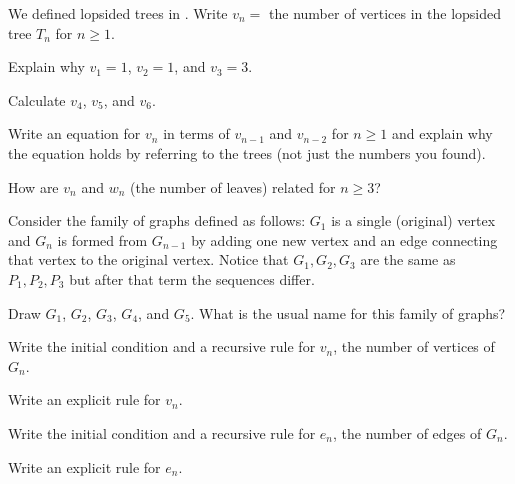 \begin{exer}[\exerP] %
\label{exer_lopsided_trees_vertices}
    We defined lopsided trees in . Write $v_n=$ the number of vertices in the lopsided tree $T_n$ for $n \ge 1$. 
        \begin{exerpart}
            \item  Explain why $v_1=1$, $v_2=1$, and $v_3=3$. 
            \item Calculate $v_4$, $v_5$, and $v_6$.
            \item \label{part_rec_trees_vertices} Write an equation for $v_n$ in terms of $v_{n-1}$ and $v_{n-2}$ for $n \ge 1$ and explain why the equation holds by referring to the trees (not just the numbers you found). 
            \item \label{part_rec_trees_vertices_function_of_leaves} How are $v_n$ and $w_n$ (the number of leaves) related for $n \ge 3$? 
        \end{exerpart}
\end{exer}

\begin{exer}[\exerU] %
\label{exer_rec_def_star_graphs}
    Consider the family of graphs defined as follows: $G_1$ is a single (original) vertex and $G_n$ is formed from $G_{n-1}$ by adding one new vertex and an edge connecting that vertex to the original vertex. Notice that $G_1, G_2, G_3$ are the same as $P_1, P_2,P_3$ but after that term the sequences differ. 
        \begin{apart}
            \item Draw $G_1$, $G_2$, $G_3$, $G_4$, and $G_5$.  What is the usual name for this family of graphs?
            \item Write the initial condition and a recursive rule for $v_n$, the number of vertices of $G_n$. 
            \item Write an explicit rule for $v_n$.
            \item Write the initial condition and a recursive rule for $e_n$, the number of edges of $G_n$.
            \item Write an explicit rule for $e_n$.
        \end{apart}
\end{exer}

